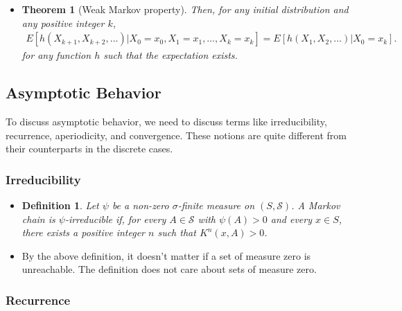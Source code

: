 \documentclass[10pt]{article}
\newtheorem{theorem}[lemma]{Theorem}
\newtheorem{definition}[lemma]{Definition}
\newcommand{\mcal}[1]{\mathcal{#1}}
\begin{document}
\begin{itemize}
  \item \begin{theorem}[Weak Markov property]
    Then, for any initial distribution and any positive integer $k$,
    \begin{align*}
      E[h(X_{k+1}, X_{k+2}, \dotsc)|X_0 = x_0, X_1 = x_1, \dotsc, X_k = x_k]  = E[h(X_1, X_2, \dotsc) | X_0 = x_k].
    \end{align*}
    for any function $h$ such that the expectation exists.
  \end{theorem}
\end{itemize}

\subsection{Asymptotic Behavior}

To discuss asymptotic behavior, we need to discuss terms like irreducibility, recurrence, aperiodicity, and convergence. These notions are quite different from their counterparts in the discrete cases.

\subsubsection{Irreducibility}

\begin{itemize}
  \item \begin{definition}
    Let $\psi$ be a non-zero $\sigma$-finite measure on $(S, \mcal{S})$. A Markov chain is $\psi$-irreducible if, for every $A \in \mcal{S}$ with $\psi(A) > 0$ and every $x \in S$, there exists a positive integer $n$ such that $K^n(x, A) > 0$.
  \end{definition}

  \item By the above definition, it doesn't matter if a set of measure zero is unreachable. The definition does not care about sets of measure zero.
  
\end{itemize}

\subsubsection{Recurrence}
\end{document}
